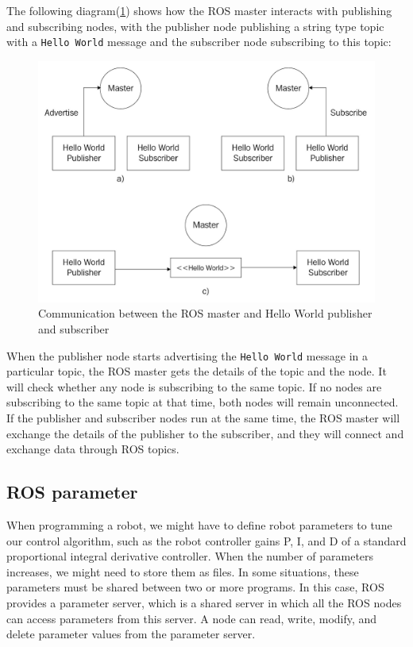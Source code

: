 \documentclass[../../main]{subfiles}
\begin{document}
The following diagram(\cref{fig:helloWorld}) shows how the ROS master interacts with publishing and
subscribing nodes, with the publisher node publishing a string type topic with a \texttt{Hello
World} message and the subscriber node subscribing to this topic:
\begin{figure}[ht]
    \centering
    \includegraphics{img/helloWorld.jpg}
    \caption[ROS Communication Overview]{Communication between the ROS master and Hello World publisher and subscriber}
    \label{fig:helloWorld}
\end{figure}
When the publisher node starts advertising the \texttt{Hello World} message in a particular
topic, the ROS master gets the details of the topic and the node. It will check whether any
node is subscribing to the same topic. If no nodes are subscribing to the same topic at that
time, both nodes will remain unconnected. If the publisher and subscriber nodes run at
the same time, the ROS master will exchange the details of the publisher to the subscriber,
and they will connect and exchange data through ROS topics.
\subsection{ROS parameter}
When programming a robot, we might have to define robot parameters to tune
our control algorithm, such as the robot controller gains P, I, and D of a standard
proportional integral derivative controller. When the number of parameters increases,
we might need to store them as files. In some situations, these parameters must be shared
between two or more programs. In this case, ROS provides a parameter server, which is a
shared server in which all the ROS nodes can access parameters from this server. A node
can read, write, modify, and delete parameter values from the parameter server.
\end{document}
